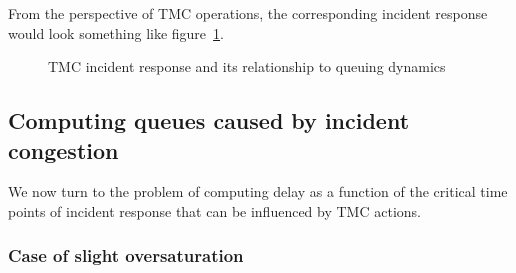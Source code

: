 \documentclass[12pt]{report}
\newcommand{\inputTikZ}[1]{%
    \begin{singlespace}
    \end{singlespace}
  }
\newcommand{\inputTikZ}[1]{%
    \begin{singlespace}
    \beginpgfgraphicnamed{#1-external}%
    \endpgfgraphicnamed%
    \end{singlespace}
  }
\newcounter{time}
\newcounter{space}
\begin{document}
From the perspective of \ac{TMC} operations, the corresponding incident
response would look something like
figure~\ref{fig:tmc-resp-and-queuing}.
\begin{figure}[tbp]
  \begin{center}
    \inputTikZ{figs/tmc-response-and-queuing}
    \caption{TMC incident response and its relationship to queuing dynamics}
    \label{fig:tmc-resp-and-queuing}
  \end{center}
\end{figure}

\subsection{Computing queues caused by incident congestion}
\label{sec:comp-queues}

We now turn to the problem of computing delay as a function of the
critical time points of incident response that can be influenced by
\ac{TMC} actions.

\subsubsection*{Case of slight oversaturation}
\end{document}
